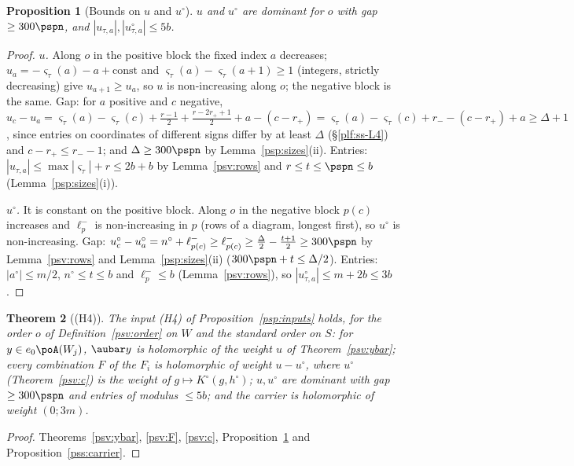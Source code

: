 \documentclass[10pt]{amsart}
\newtheorem{theorem}{Theorem}[section]
\newtheorem{proposition}[theorem]{Proposition}
\theoremstyle{definition}
\theoremstyle{remark}
\begin{document}
\begin{proposition}[Bounds on $u$ and $u^\circ$]\label{psv:bounds}
$u$ and $u^\circ$ are dominant for $o$ with gap $\ge300\pspn$, and $|u_{\tau,a}|,|u^\circ_{\tau,a}|\le5b$.
\end{proposition}
\begin{proof}
\emph{$u$.} Along $o$ in the positive block the fixed index $a$ decreases; $u_a=-\varsigma_\tau(a)-a+\mathrm{const}$ and
$\varsigma_\tau(a)-\varsigma_\tau(a+1)\ge1$ (integers, strictly decreasing) give $u_{a+1}\ge u_a$, so $u$ is non-increasing along
$o$; the negative block is the same. Gap: for $a$ positive and $c$ negative, $u_c-u_a=\varsigma_\tau(a)-\varsigma_\tau(c)+
\frac{r-1}2+\frac{r-2r_++1}2+a-(c-r_+)=\varsigma_\tau(a)-\varsigma_\tau(c)+r_--(c-r_+)+a\ge\Delta+1$, since entries on coordinates of
different signs differ by at least $\Delta$ (\S\ref{plf:ss-L4}) and $c-r_+\le r_--1$; and $\Delta\ge300\pspn$ by
Lemma~\ref{psp:sizes}(ii). Entries: $|u_{\tau,a}|\le\max|\varsigma_\tau|+r\le2b+b$ by Lemma~\ref{psv:rows} and $r\le t\le\pspn\le b$
(Lemma~\ref{psp:sizes}(i)).

\emph{$u^\circ$.} It is constant on the positive block. Along $o$ in the negative block $p(c)$ increases and
$\ell^-_p$ is non-increasing in $p$ (rows of a diagram, longest first), so $u^\circ$ is non-increasing. Gap:
$u^\circ_c-u^\circ_a=n^\circ+\ell^-_{p(c)}\ge\ell^-_{p(c)}\ge\frac\Delta2-\frac{t+1}2\ge300\pspn$ by Lemma~\ref{psv:rows} and
Lemma~\ref{psp:sizes}(ii) ($300\pspn+t\le\Delta/2$). Entries: $|a^\circ|\le m/2$, $n^\circ\le t\le b$ and $\ell^-_p\le b$
(Lemma~\ref{psv:rows}), so $|u^\circ_{\tau,a}|\le m+2b\le3b$.
\end{proof}

\begin{theorem}[(H4)]\label{psv:H4}
The input \textup{(H4)} of Proposition~\ref{psp:inputs} holds, for the order $o$ of Definition~\ref{psv:order} on
$W$ and the standard order on $S$: for $y\in e_0\poA(W_j)$, $\aubar y$ is holomorphic of the weight $u$ of
Theorem~\ref{psv:ybar}; every combination $F$ of the $F_i$ is holomorphic of weight $u-u^\circ$, where $u^\circ$
\textup(Theorem~\ref{psv:c}\textup) is the weight of $g\mapsto K^\circ(g,h^\circ)$; $u,u^\circ$ are dominant with gap
$\ge300\pspn$ and entries of modulus $\le5b$; and the carrier is holomorphic of weight $(0;3m)$.
\end{theorem}
\begin{proof}
Theorems~\ref{psv:ybar}, \ref{psv:F}, \ref{psv:c}, Proposition~\ref{psv:bounds} and Proposition~\ref{pss:carrier}.
\end{proof}
\end{document}
